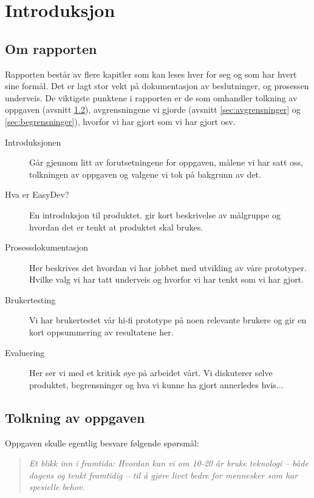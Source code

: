 \chapter{Introduksjon}

\section{Om rapporten}
Rapporten består av flere kapitler som kan leses hver for seg og som har hvert sine formål. Det er lagt stor vekt på dokumentasjon av beslutninger, og prosessen underveis. 
De viktigste punktene i rapporten er de som omhandler tolkning av oppgaven (avsnitt \ref{sec:tolkning}), avgrensningene vi gjorde (avsnitt \ref{sec:avgrensninger} og \ref{sec:begrensninger}), hvorfor vi har gjort som vi har gjort osv. 

\begin{description}

\item[Introduksjonen] Går gjennom litt av forutsetningene for oppgaven, målene vi har satt oss, tolkningen av oppgaven og valgene vi tok på bakgrunn av det. 

\item[Hva er EasyDev?] En introduksjon til produktet. gir kort beskrivelse av målgruppe og hvordan det er tenkt at produktet skal brukes.

\item[Prosessdokumentasjon] Her beskrives det hvordan vi har jobbet med utvikling av våre prototyper. Hvilke valg vi har tatt underveis og hvorfor vi har tenkt som vi har gjort.

\item[Brukertesting] Vi har brukertestet vår hi-fi prototype på noen relevante brukere og gir en kort oppsummering av resultatene her.

\item[Evaluering] Her ser vi med et kritisk øye på arbeidet vårt. Vi diskuterer selve produktet, begrensninger og hva vi kunne ha gjort annerledes hvis...

\end{description}



\section{Tolkning av oppgaven} \label{sec:tolkning}
Oppgaven skulle egentlig besvare følgende spørsmål: 
\begin{quote}
\textit{Et	blikk	inn	i	framtida:	Hvordan	kan	vi	om	10-20	år	bruke	teknologi	
– både	dagens	og	tenkt	framtidig	– til	å	gjøre	livet	bedre	for	
mennesker	som	har	spesielle behov.}
\end{quote}

